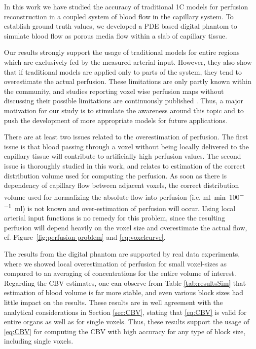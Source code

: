 \documentclass[journal,twocolumn]{IEEEtran}
\newcommand{\siPml}{\milli\litre\per\minute\per100\milli\litre}
\begin{document}
	
	In this work we have studied the accuracy of traditional 1C models for perfusion reconstruction in a coupled system of blood flow in the capillary system.
	To establish ground truth values, we developed a PDE based digital phantom to simulate blood flow as porous media flow within a slab of capillary tissue.

	Our results strongly support the usage of traditional models for entire regions which are exclusively fed by the measured arterial input.
	However, they also show that if traditional models are applied only to parts of the system, they tend to overestimate the actual perfusion. 
	These limitations are only partly known within the community, and studies reporting voxel wise perfusion maps without discussing their possible limitations are continuously published \cite{Mokin16,Kickingereder15}. 
	Thus, a major motivation for our study is to stimulate the awareness around this topic and to push the development of more appropriate models for future applications.
	

	There are at least two issues related to the overestimation of perfusion. 
	The first issue is that blood passing through a voxel without being locally delivered to the capillary tissue will contribute to artificially high perfusion values. 
	The second issue is thoroughly studied in this work, and relates to estimation of the correct distribution volume used for computing the perfusion. As soon as there is dependency of capillary flow between adjacent voxels, the correct distribution volume used for normalizing the absolute flow into perfusion (i.e. \si{\siPml}) is not known and over-estimation of perfusion will occur. 
	Using local arterial input functions is no remedy for this problem, since the resulting perfusion will depend heavily on the voxel size and overestimate the actual flow, cf. Figure~\ref{fig:perfusion-problem} and \eqref{eq:voxelcurve}.

	The results from the digital phantom are supported by real data experiments, where we showed local overestimation of perfusion for small voxel-sizes as compared to an averaging of concentrations for the entire volume of interest.
	Regarding the CBV estimates, one can observe from Table \ref{tab:resultsSim} that estimation of blood volume is far more stable, and  even various block sizes had little impact on the results. 
	These results are in well agreement with the analytical considerations in Section \ref{sec:CBV}, stating that \eqref{eq:CBV} is valid for entire organs as well as for single voxels. 
	Thus, these results support the usage of \eqref{eq:CBV} for computing the CBV with high accuracy for any type of block size, including single voxels.
\end{document}
